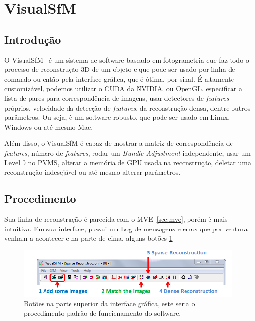 \section{VisualSfM}\label{sec:visualsfm}
%
\subsection*{Introdução}

O VisualSfM~\cite{wu2011visualsfm} é um sistema de software baseado em fotogrametria
que faz todo o processo de reconstrução 3D de um objeto e que pode ser usado por
linha de comando ou então pela interface gráfica, que é ótima, por sinal. É
altamente customizável, podemos utilizar o CUDA da NVIDIA, ou OpenGL,
especificar a lista de pares para correspondência de imagens, usar detectores de
\emph{features} próprios, velocidade da detecção de \emph{features}, da
reconstrução densa, dentre outros parâmetros. Ou seja, é um software
robusto, que pode ser usado em Linux, Windows ou até mesmo Mac.

Além disso, o VisualSfM é capaz de mostrar a matriz de correspondência de \emph{features}, número de \emph{features}, rodar um \emph{Bundle Adjustment} independente, usar um Level 0 no PVMS, alterar a memória de GPU usada na reconstrução, deletar uma reconstrução indesejável ou até mesmo alterar parâmetros.

\subsection*{Procedimento}

Sua linha de reconstrução é parecida com o MVE~\ref{sec:mve}, porém é mais intuitiva. Em sua interface, possui um Log de mensagens e erros que por ventura venham a acontecer e na parte de cima, alguns botões \ref{fig:pipelineVisualSfM}

\begin{figure}[!h]
	\centering
	\includegraphics[width=1\linewidth]{figs/pipelinevisualsfm.png}
	\caption{%
	Botões na parte superior da interface gráfica, este seria o procedimento padrão de funcionamento do software.
	\protect\cite{wu2011visualsfm}
	}\label{fig:pipelineVisualSfM}
\end{figure}


